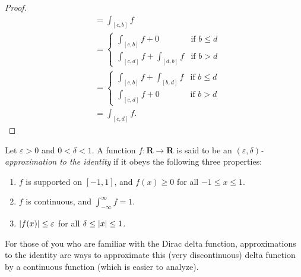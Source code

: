 \begin{proof}
\begin{align*}
                                & = \int_{[c, b]} f                                                                                                                                                 \\
                                & = \begin{cases}
                                        \int_{[c, b]} f + 0               & \text{if } b \leq d \\
                                        \int_{[c, d]} f + \int_{[d, b]} f & \text{if } b > d
                                    \end{cases}                                       \\
                                & = \begin{cases}
                                        \int_{[c, b]} f + \int_{[b, d]} f & \text{if } b \leq d \\
                                        \int_{[c, d]} f + 0               & \text{if } b > d
                                    \end{cases}                                       \\
                                & = \int_{[c, d]} f.
    \end{align*}
\end{proof}

\begin{definition}\label{3.8.6}
    Let \(\varepsilon > 0\) and \(0 < \delta < 1\).
    A function \(f : \mathbf{R} \to \mathbf{R}\) is said to be an \emph{\((\varepsilon, \delta)\)-approximation to the identity} if it obeys the following three properties:
    \begin{enumerate}
        \item \(f\) is supported on \([-1, 1]\), and \(f(x) \geq 0\) for all \(-1 \leq x \leq 1\).
        \item \(f\) is continuous, and \(\int_{-\infty}^\infty f = 1\).
        \item \(\abs*{f(x)} \leq \varepsilon\) for all \(\delta \leq \abs*{x} \leq 1\).
    \end{enumerate}
\end{definition}

\begin{remark}\label{3.8.7}
    For those of you who are familiar with the Dirac delta function, approximations to the identity are ways to approximate this (very discontinuous) delta function by a continuous function (which is easier to analyze).
\end{remark}

